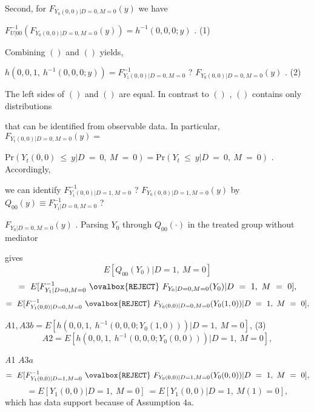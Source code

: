 \documentclass[a4paper,12pt]{article}
\begin{document}
Second, for $F_{Y_{0}(0,0)|D=0,M=0}(y)$ we have
\begin{center}
$F_{U|00}^{-1}(F_{Y_{0}(0,0)|D=0,M=0}(y))=h^{-1}(0,0,0;y)$ .   (1)
\end{center}
Combining $()$ and $()$ yields,
\begin{center}
$h(0,0,1,\ h^{-1}(0,0,0;y))=F_{Y_{1}(0,0)|D=0,M=0}^{-1}$ ? $F_{Y_{0}(0,0)|D=0,M=0}(y)$ .   (2)
\end{center}
The left sides of $()$ and $()$ are equal. In contrast to $()$ , $()$ contains only distributions

that can be identified from observable data. In particular, $F_{Y_{\mathrm{t}}(0,0)|D=0,M=0}(y) =$

$\mathrm{P}\mathrm{r} (Y_{t}(0,0)\ \leq\ y|D\ =\ 0,\ M\ =\ 0) = \mathrm{P}\mathrm{r}(Y_{t}\ \leq\ y|D\ =\ 0,\ M\ =\ 0)$ . Accordingly,

we can identify $F_{Y_{1}(0,0)|D=1,M=0}^{-1}$ ? $F_{Y_{0}(0,0)|D=1,M=0}(y)$ by $Q_{00}(y) \equiv F_{Y_{1}|D=0,M=0}^{-1}$ ?

$F_{Y_{0}|D=0,M=0}(y)$ . Parsing $Y_{0}$ through $Q_{00}(\cdot)$ in the treated group without mediator

gives
$$
E[Q_{00}(Y_{0})|D=1,\ M=0]
$$
$$
=\ E[F_{Y_{1}|D=0,M=0}^{-1}\ \ovalbox{\tt\small REJECT}\ F_{Y_{0}|D=0,M=0}(Y_{0})|D\ =\ 1,\ M\ =\ 0],
$$
$$
=\ E[F_{Y_{1}(0,0)|D=0,M=0}^{-1}\ \ovalbox{\tt\small REJECT}\ F_{Y_{0}(0,0)|D=0,M=0}(Y_{0}(1,0))|D\ =\ 1,\ M\ =\ 0],
$$
\begin{center}
$A1,A3b=E[h(0,0,1,\ h^{-1}(0,0,0;Y_{0}(1,0)))|D=1,\ M=0]$,   (3)
$$
A2=E[h(0,0,1,\ h^{-1}(0,0,0;Y_{0}(0,0)))|D=1,\ M=0],
$$
\end{center}
{\it A}1 $A3a$
$$
=\ E[F_{Y_{1}(0,0)|D=1,M=0}^{-1}\ \ovalbox{\tt\small REJECT}\ F_{Y_{0}(0,0)|D=1,M=0}(Y_{0}(0,0))|D\ =\ 1,\ M\ =\ 0],
$$
$$
=E[Y_{1}(0,0)|D=1,\ M=0]\ =E[Y_{1}(0,0)|D=1,\ M(1)=0],
$$
which has data support because of Assumption $4\mathrm{a}.$
\end{document}
